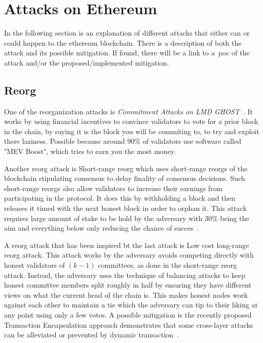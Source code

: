 
\section{Attacks on Ethereum}\label{sec:attacks-on-ethereum}
In the following section is an explanation of different attacks
that either can or could happen to the ethereum blockchain.
There is a description of both the attack and its possible mitigation.
If found, there will be a link to a~\gls{poc} of the attack and/or the proposed/implemented mitigation.
\subsection{Reorg}\label{subsec:reorg}
One of the reorganization attacks is \textit{Commitment Attacks on LMD GHOST}~\cite{sarenche2024breakingbalancepowercommitment}.
It works by using financial incentives to convince validators to vote for a prior block in the chain, by saying it is the block you will be commiting to, to try and exploit there laziness.
Possible because around 90\% of validators use software called "MEV Boost", which tries to earn you the most money.

Another reorg attack is Short-range reorg which uses short-range reorgs of the blockchain stipulating consensus to delay finality of consensus decisions.
Such short-range reorgs also allow validators to increase their earnings from participating in the protocol.
It does this by withholding a block and then releases it timed with the next honest block in order to orphan it.
This attack requires large amount of stake to be hold by the adversary with 30\% being the aim and everything below only reducing the chance of succes~\cite{10.1007/978-3-031-18283-9_28}.

A reorg attack that has been inspired bt the last attack is Low cost long-range reorg attack.
This attack works by the adversary avoids competing directly with honest validators of $(k - 1)$ committees, as done in the short-range reorg attack.
Instead, the adversary uses the technique of balancing attacks to keep honest committee members split roughly in half by ensuring they have different views on what the current head of the chain is.
This makes honest nodes work against each other to maintain a tie which the adversary can tip to their liking at any point using only a few votes.
A possible mitigation is the recently proposed Transaction Encapsulation approach demonstrates that some cross-layer attacks can be alleviated or prevented by dynamic transaction~\cite{10.1007/978-3-031-18283-9_28}.

